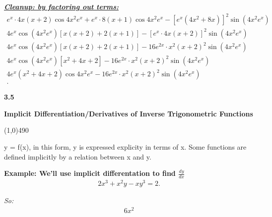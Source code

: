 \documentclass{report}
\begin{document}
  \bigbreak \noindent \bigbreak \noindent 
  \textbf{\textit{\underline{Cleanup: by factoring out terms:}}}
  \begin{align*}
    e^{x}\cdot 4x(x+2)\cos{4x^{2}e^{x}}+e^{x}\cdot 8(x+1)\cos{4x^{2}e^{x}}-[e^{x}(4x^{2}+8x)]^2\sin{(4x^{2}e^{x})} \\
    4e^{x}\cos{(4x^{2}e^{x})}[x(x+2) + 2(x+1)] - [e^{x}\cdot 4x(x+2)]^2\sin{(4x^{2}e^{x})} \\
    4e^{x}\cos{(4x^{2}e^{x})}[x(x+2) + 2(x+1)] - 16e^{2x}\cdot x^2(x+2)^2\sin{(4x^{2}e^{x})} \\
    4e^{x}\cos{(4x^{2}e^{x})}[x^{2}+4x+2] - 16e^{2x}\cdot x^2(x+2)^2\sin{(4x^{2}e^{x})} \\
    4e^{x}(x^{2}+4x+2)\cos{4x^{2}e^{x}}- 16e^{2x}\cdot x^2(x+2)^2\sin{(4x^{2}e^{x})} \\
  .\end{align*}

  \pagebreak \bigbreak \noindent
  \begin{Large}
      \begin{mdframed}
          \begin{center}
              \textbf{3.5}
          \end{center}
      \end{mdframed}
  \end{Large}
  \begin{Large}
      \begin{center}
          \textbf{Implicit Differentiation/Derivatives of Inverse Trigonometric Functions}
      \end{center}
  \end{Large}
  \line(1,0){490}
  
  \bigbreak \noindent 
  y = f(x), in this form, y is expressed explicity in terms of x. Some functions are defined implicitly by a relation between x and y.

  \bigbreak \noindent 
  \begin{mdframed}
    \textbf{Example: We'll use implicit differentation to find $\frac{dy}{dx}$}
    \begin{align*}
      2x^{3} +x^{2}y - xy^{3} = 2
    .\end{align*}
  \end{mdframed}
  \bigbreak \noindent 
  \bigbreak \noindent
  \textit{So:}
  \begin{align*}
    6x^{2}
  \end{align*}
 
\end{document}
